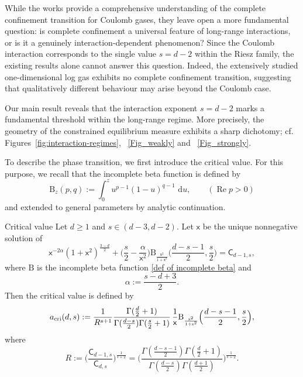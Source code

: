 \documentclass{amsart}
\newcommand{\re}{\operatorname{Re}}
\newcommand{\ud}{\, \mathrm{d}}
\theoremstyle{plain}
\theoremstyle{remark}
\numberwithin{equation}{section}
\begin{document}
While the works \cite{DKMSS17,ASZ14,BFMS26,FIT26} provide a comprehensive understanding of the complete confinement transition for Coulomb gases, they leave open a more fundamental question: is complete confinement a universal feature of long-range interactions, or is it a genuinely interaction-dependent phenomenon? Since the Coulomb interaction corresponds to the single value \(s=d-2\) within the Riesz family, the existing results alone cannot answer this question. Indeed, the extensively studied one-dimensional log gas exhibits no complete confinement transition, suggesting that qualitatively different behaviour may arise beyond the Coulomb case. 

Our main result reveals that the interaction exponent $s=d-2$ marks a
fundamental threshold within the long-range regime. More precisely, the
geometry of the constrained equilibrium measure exhibits a sharp dichotomy; cf. Figures~\ref{fig:interaction-regimes}, ~\ref{Fig_weakly} and ~\ref{Fig_strongly}. 

To describe the phase transition, we first introduce the critical value.
For this purpose, we recall that the incomplete beta function
\cite[Section~8.17]{NIST} is defined by
\begin{equation} \label{def of incomplete beta}
\mathrm{B}_z(p,q)
:=
\int_0^z
u^{p-1}(1-u)^{q-1}\,\ud u,
\qquad
(\re p>0)
\end{equation} 
and extended to general parameters by analytic continuation. 

\begin{defn}{Critical value} Let $d \ge 1$ and $s \in (d-3,d-2)$. 
Let \(\mathsf{x}\) be the unique nonnegative solution of
\begin{equation}
\label{eq:critical point incomplete beta}
\mathsf{x}^{-2\alpha}
    (1+\mathsf{x}^2)^{\frac{3-d}{2}}
    +
    \Big(
        \frac{s}{2}
        -
        \frac{\alpha}{\mathsf{x}^2}
    \Big)
    \mathrm{B}_{\frac{\mathsf{x}^2}{1+\mathsf{x}^2}}
    \Big(
        \frac{d-s-1}{2},
        \frac{s}{2}
    \Big)
    =
    \mathsf{C}_{d-1,s},
\end{equation}
where $\mathrm{B}$ is the incomplete beta function \eqref{def of incomplete beta} and 
\begin{equation} \label{def of alpha}
 \alpha := \frac{s-d+3}{2}. 
\end{equation} 
Then the critical value is defined by \begin{equation}
\label{eq:a critical incomplete beta}
    a_{\rm cri}(d,s)
    :=
 \frac{1}{R^{s+1}}    \frac{
        \Gamma(\frac{d}{2}+1)
    }{
        \Gamma(\frac{d-s}{2})
        \Gamma(\frac{s}{2}+1)
    }  \, 
    \frac{1}{\mathsf{x}}
    \mathrm{B}_{\frac{\mathsf{x}^2}{1+\mathsf{x}^2}}
    \Big(
        \frac{d-s-1}{2},
        \frac{s}{2}
    \Big),
\end{equation}
where \begin{equation} \label{def of R}
    R
    :=\Big(\frac{\mathsf{C}_{d-1,s}}{\mathsf{C}_{d,s}}\Big)^{\frac{1}{s+2}}=
    \bigg(
    \frac{
    \Gamma(\tfrac{d-s-1}{2})
    \Gamma(\tfrac{d}{2}+1)
    }{
    \Gamma(\tfrac{d-s}{2})
    \Gamma(\tfrac{d+1}{2})
    }
    \bigg)^{\frac{1}{s+2}}.
\end{equation}
\end{defn}
\end{document}
